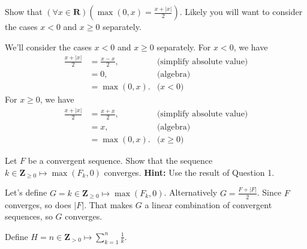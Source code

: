 \documentclass[12pt,fleqn,answers]{exam}
\newcommand{\reals}{\mathbf{R}}
\newcommand{\integers}{\mathbf{Z}}
\begin{document}
\begin{questions} 

\question[5] Show that \(\left( \forall x \in \reals \right) \left(\max(0,x) = \frac{x+|x|}{2} \right) \).
Likely you will want to consider the cases $x < 0$ and $x \geq 0$ separately.

\begin{solution}  We'll consider the cases $x < 0$ and $x \geq 0$ 
    separately. For $x < 0$, we have
    \begin{align*}
        \frac{x+|x|}{2} &= \frac{x-x}{2}, &\mbox{(simplify absolute value)} \\
                        &= 0, &\mbox{(algebra)} \\
                        &= \max(0,x). &\mbox{($x < 0$)} 
    \end{align*}
    For $x \geq 0$, we have
    \begin{align*}
        \frac{x+|x|}{2} &= \frac{x+x}{2}, &\mbox{(simplify absolute value)} \\
                        &= x, &\mbox{(algebra)} \\
                        &= \max(0,x). &\mbox{($x \geq 0$)} 
    \end{align*}
\end{solution}

\question[5] Let $F$ be a convergent sequence. Show that the sequence 
\(k \in \integers_{\geq 0} \mapsto \max(F_k,0)\) converges.
\textbf{Hint:} Use the result of Question 1. 

\begin{solution}  Let's define \(G = k \in \integers_{\geq 0} \mapsto \max(F_k,0)\).
    Alternatively \(G = \frac{F  + |F|}{2}\). Since $F$ converges,
    so does $|F|$. That makes $G$ a linear combination
    of convergent sequences, so $G$ converges.



\end{solution}


\question Define 
\(\displaystyle
    H = n \in \integers_{> 0} \mapsto \sum_{k=1}^n \frac{1}{k}.
\)

\begin{parts}


\end{parts}
\end{questions}
\end{document}
